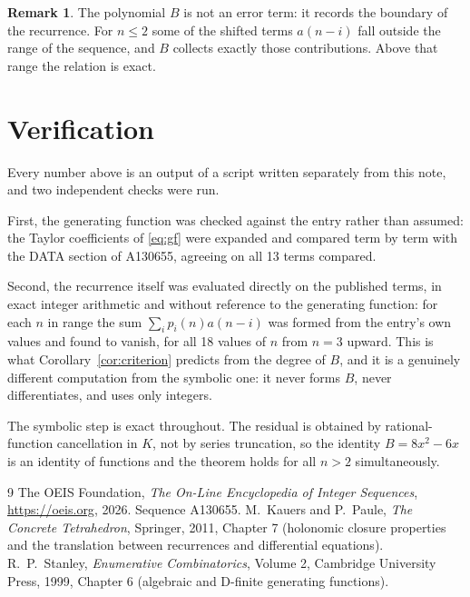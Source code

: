 \documentclass[11pt,a4paper]{article}
\theoremstyle{plain}
\theoremstyle{definition}
\newtheorem{remark}[theorem]{Remark}
\begin{document}
\begin{remark}
The polynomial $B$ is not an error term: it records the boundary of the recurrence. For
$n\le2$ some of the shifted terms $a(n-i)$ fall outside the range of the sequence,
and $B$ collects exactly those contributions. Above that range the relation is exact.
\end{remark}

\section{Verification}

Every number above is an output of a script written separately from this note, and two
independent checks were run.

First, the generating function was checked against the entry rather than assumed: the
Taylor coefficients of \eqref{eq:gf} were expanded and compared term by term with the DATA
section of A130655, agreeing on all 13 terms compared.

Second, the recurrence itself was evaluated directly on the published terms, in exact
integer arithmetic and without reference to the generating function: for each $n$ in range
the sum $\sum_{i}p_{i}(n)a(n-i)$ was formed from the entry's own values and found to
vanish, for all 18 values of $n$ from $n=3$ upward. This is what
Corollary~\ref{cor:criterion} predicts from the degree of $B$, and it is a genuinely
different computation from the symbolic one: it never forms $B$, never differentiates, and
uses only integers.

The symbolic step is exact throughout. The residual is obtained by rational-function
cancellation in $K$, not by series truncation, so the identity $B=8 x^{2} - 6 x$ is an
identity of functions and the theorem holds for all $n>2$ simultaneously.

\begin{thebibliography}{9}
 The OEIS Foundation, \emph{The On-Line Encyclopedia of Integer Sequences},
\url{https://oeis.org}, 2026. Sequence A130655.
 M.~Kauers and P.~Paule, \emph{The Concrete Tetrahedron}, Springer, 2011,
Chapter 7 (holonomic closure properties and the translation between recurrences and
differential equations).
 R.~P.~Stanley, \emph{Enumerative Combinatorics}, Volume 2, Cambridge
University Press, 1999, Chapter 6 (algebraic and D-finite generating functions).
\end{thebibliography}
\end{document}

